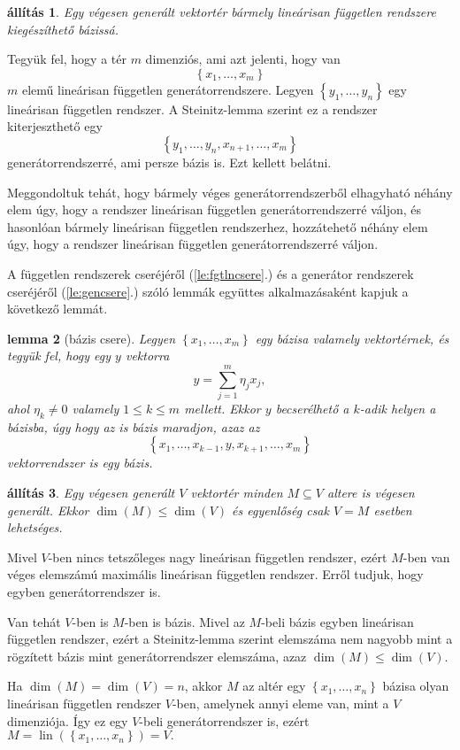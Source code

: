 \documentclass[9pt, a4paper, showtrims]{memoir}
\makeatletter
\renewenvironment{proof}[1][\proofname]
    {\par\pushQED{\qed}%
    \normalfont \topsep6\p@\@plus6\p@\relax
    \trivlist
    \item[\hskip\labelsep
        \itshape
    #1\@addpunct{:}]\ignorespaces}
    {\popQED\endtrivlist\@endpefalse}
\theoremstyle{plain}
\newtheorem{proposition}{állítás}[chapter]
\newtheorem{lemma}[proposition]{lemma}
\theoremstyle{remark}
\theoremstyle{definition}
\DeclareMathOperator{\lin}{lin}
\makeatother
\begin{document}
\begin{proposition}
	Egy végesen generált vektortér bármely lineárisan független rendszere kiegészíthető bázissá.
	\label{pr:lfgtenbazissa}
\end{proposition}
\begin{proof}
	Tegyük fel, hogy a tér $m$ dimenziós, ami azt jelenti, hogy van
	\[
		\left\{ x_1,\ldots,x_m \right\}
	\]
	$m$ elemű lineárisan független generátorrendszere.
	Legyen $\left\{ y_1,\ldots,y_n \right\}$ egy lineárisan független rendszer.
	A Steinitz-lemma szerint ez a rendszer kiterjeszthető egy
	\[
		\left\{ y_1,\ldots,y_n,x_{n+1},\ldots,x_m \right\}
	\]
	generátorrendszerré, ami persze bázis is.
	Ezt kellett belátni.
\end{proof}

Meggondoltuk tehát, hogy bármely véges generátorrendszerből elhagyható néhány elem úgy,
hogy a rendszer lineárisan független generátorrendszerré váljon,
és hasonlóan bármely lineárisan független rendszerhez, hozzátehető néhány elem úgy, hogy a
rendszer lineárisan független generátorrendszerré váljon.

A független rendszerek cseréjéről (\ref{le:fgtlncsere}.) és a generátor rendszerek cseréjéről (\ref{le:gencsere}.) szóló lemmák
együttes alkalmazásaként kapjuk a következő lemmát.

\begin{lemma}[bázis csere]\label{le:baziscsere}
	Legyen $\left\{ x_1,\ldots,x_m \right\}$ egy bázisa valamely vektortérnek,
	és tegyük fel,
	hogy egy $y$ vektorra
	\[
		y=\sum_{j=1}^m\eta_jx_j,
	\]
	ahol $\eta_k\neq 0$ valamely $1\leq k\leq m$ mellett.
	Ekkor $y$ becserélhető a $k$-adik helyen a bázisba,
	úgy hogy az is bázis maradjon, azaz az
	\[
		\left\{ x_1,\ldots,x_{k-1},y,x_{k+1},\ldots,x_m \right\}
	\]
	vektorrendszer is egy bázis.
\end{lemma}

\begin{proposition}
	Egy végesen generált $V$ vektortér minden $M\subseteq V$ altere is végesen generált.
    Ekkor $\dim(M)\leq \dim(V)$ és egyenlőség csak $V=M$ esetben lehetséges.
\end{proposition}
\begin{proof}
	Mivel $V$-ben nincs tetszőleges nagy lineárisan független rendszer,
	ezért $M$-ben van véges elemszámú maximális lineárisan független rendszer.
	Erről tudjuk, hogy egyben generátorrendszer is.

	Van tehát $V$-ben is $M$-ben is bázis.
	Mivel az $M$-beli bázis egyben lineárisan független rendszer,
	ezért a Steinitz-lemma szerint 
    elemszáma nem nagyobb mint a rögzített bázis mint generátorrendszer elemszáma,
    azaz $\dim(M)\leq \dim(V).$

    Ha $\dim(M)=\dim(V)=n$, akkor $M$ az altér egy $\left\{ x_1,\ldots,x_n \right\}$ bázisa olyan lineárisan független rendszer $V$-ben, 
    amelynek annyi eleme van, mint a $V$ dimenziója.
    Így ez egy $V$-beli generátorrendszer is, ezért 
    $M=\lin\left( \left\{ x_1,\ldots,x_n \right\}\right)=V. $
\end{proof}
\end{document}
